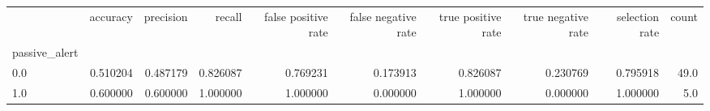 \begin{tabular}{lrrrrrrrrr}
\toprule
{} &  accuracy &  precision &    recall &  false positive rate &  false negative rate &  true positive rate &  true negative rate &  selection rate &  count \\
passive\_alert &           &            &           &                      &                      &                     &                     &                 &        \\
\midrule
0.0           &  0.510204 &   0.487179 &  0.826087 &             0.769231 &             0.173913 &            0.826087 &            0.230769 &        0.795918 &   49.0 \\
1.0           &  0.600000 &   0.600000 &  1.000000 &             1.000000 &             0.000000 &            1.000000 &            0.000000 &        1.000000 &    5.0 \\
\bottomrule
\end{tabular}
